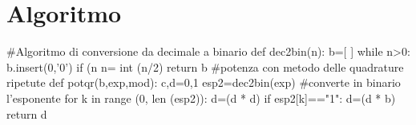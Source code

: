 \documentclass[14pt,a4paper]{article}
\begin{document}
	\section{Algoritmo}
	
	\begin{codice_python}
	#Algoritmo di conversione da decimale a binario
	def dec2bin(n):
		b=[ ]
		while n>0:
			b.insert(0,'0') if (n%
			n= int (n/2) 
		return b
	#potenza con metodo delle quadrature ripetute
	def potqr(b,exp,mod):
		c,d=0,1
		esp2=dec2bin(exp) #converte in binario l'esponente
		for k in range (0, len (esp2)):
			d=(d * d)%
			if esp2[k]=="1":
				d=(d * b)%
		return d
	\end{codice_python}
\end{document}
